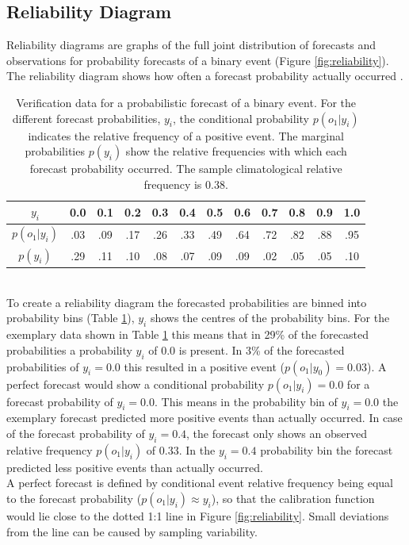 \documentclass[11pt,twoside,a4paper,fleqn,x11names]{report}
\numberwithin{equation}{chapter}
\numberwithin{figure}{chapter}
\numberwithin{table}{chapter}
\begin{document}
\subsection{Reliability Diagram}
Reliability diagrams are graphs of the full joint distribution of forecasts and observations for probability forecasts of a binary event (Figure \ref{fig:reliability}). The reliability diagram shows how often a forecast probability actually occurred \citep{Wilks}.%
\begin{table}[!htbp]
	\centering
	\begin{tabular}{cccccccccccc}
		\hline
		$y_i$ & 0.0 & 0.1 &0.2 &0.3 &0.4 &0.5 &0.6 &0.7 &0.8 &0.9 &1.0\\\hline
		$p(o_1|y_i)$ & .03&.09&.17&.26&.33&.49&.64&.72&.82&.88&.95\\
		$p(y_i)$& .29&.11&.10&.08&.07&.09&.09&.02&.05&.05&.10\\\hline
	\end{tabular}
	\caption[]{Verification data for a probabilistic forecast of a binary event. For the different forecast probabilities, $y_i$, the conditional probability $p(o_1|y_i)$ indicates the relative frequency of a positive  event. The marginal probabilities $p(y_i)$ show the relative frequencies with which each forecast probability occurred. The sample climatological relative frequency is 0.38.}
	\label{tab:verification}
\end{table}\\
To create a reliability diagram the forecasted probabilities are binned into probability bins (Table \ref{tab:verification}), $y_i$ shows the centres of the probability bins. For the exemplary data shown in Table \ref{tab:verification} this means that in 29\% of the forecasted probabilities a probability $y_i$ of 0.0 is present. In 3\% of the forecasted probabilities of $y_i = 0.0$ this resulted in a positive event ($p(o_1|y_0) = 0.03$). A perfect forecast would show a conditional probability $p(o_1|y_i) = 0.0$ for a forecast probability of $y_i = 0.0$. This means in the probability bin of $y_i=0.0$ the exemplary forecast predicted more positive events than actually occurred. In case of the forecast probability of $y_i = 0.4$, the forecast only shows an observed relative frequency $p(o_1|y_i)$ of 0.33. In the $y_i = 0.4$ probability bin the forecast predicted less positive events than actually occurred.\\
A perfect forecast is defined by conditional event relative frequency being equal to the forecast probability ($p(o_1|y_i) \approx y_i$), so that the calibration function would lie close to the dotted 1:1 line in Figure \ref{fig:reliability}. Small deviations from the line can be caused by sampling variability.
\end{document}
